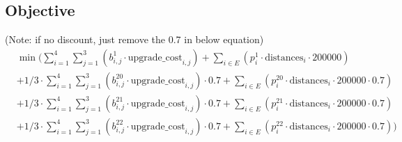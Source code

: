 \documentclass{article}
\begin{document}
	
	\subsection*{Objective}
		(Note: if no discount, just remove the 0.7 in below equation)
		\begin{align*}
		&\min(  \sum_{i = 1}^{4} \sum_{j = 1}^{3} (b^{1}_{i,j}  \cdot \text{upgrade\_cost}_{i,j}) + \sum_{i \in E} (p^{1}_i \cdot \text{distances}_{i} \cdot 200000)\\
		&+ 1/3 \cdot \sum_{i = 1}^{4} \sum_{j = 1}^{3} (b^{20}_{i,j}  \cdot \text{upgrade\_cost}_{i,j}) \cdot 0.7 +  \sum_{i \in E} (p^{20}_i \cdot \text{distances}_{i} \cdot 200000 \cdot 0.7) \\
		&+ 1/3 \cdot \sum_{i = 1}^{4} \sum_{j = 1}^{3} (b^{21}_{i,j}  \cdot \text{upgrade\_cost}_{i,j}) \cdot 0.7 +  \sum_{i \in E} (p^{21}_i \cdot \text{distances}_{i} \cdot 200000 \cdot 0.7) \\
		&+ 1/3 \cdot \sum_{i = 1}^{4} \sum_{j = 1}^{3} (b^{22}_{i,j}  \cdot \text{upgrade\_cost}_{i,j}) \cdot 0.7 +  \sum_{i \in E} (p^{22}_i \cdot \text{distances}_{i} \cdot 200000 \cdot 0.7)) \\
		\end{align*}
	  
\end{document}
